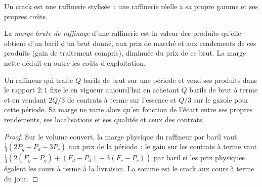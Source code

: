 Un crack est une raffinerie stylisée~: une raffinerie réelle a sa propre gamme et ses propres coûts.

\begin{definition}\label{def:m3:refined-products-and-cracks:grm}
La \emph{marge brute de raffinage} d'une raffinerie est la
valeur des produits qu'elle obtient d'un baril d'un brut donné, aux prix de marché
et aux rendements de ces produits (gain de traitement compris), diminuée du prix de ce brut. La marge nette
déduit en outre les coûts d'exploitation.
\end{definition}

\begin{proposition}\label{prop:m3:refined-products-and-cracks:hedge}
Un raffineur qui traite $Q$ barils de brut sur une période et vend ses produits dans le
rapport $2:1$ fixe le  en vigueur aujourd'hui en achetant $Q$ barils de brut
à terme et en vendant $2Q/3$ de contrats à terme sur l'essence et $Q/3$ sur le gazole pour cette période.
Sa marge ne varie alors qu'en fonction de l'écart entre ses propres rendements, ses localisations et
ses qualités et ceux des contrats.
\end{proposition}

\begin{proof}
Sur le volume couvert, la marge physique du raffineur par baril vaut $\frac{1}{3}(2P_g + P_d
- 3P_c)$ aux prix de la période~; le gain sur les contrats à terme vaut $\frac{1}{3}(2(F_g - P_g) + (F_d -
P_d) - 3(F_c - P_c))$ par baril si les prix physiques égalent les cours à terme à
la livraison. La somme est le crack aux cours à terme du jour.
\end{proof}

